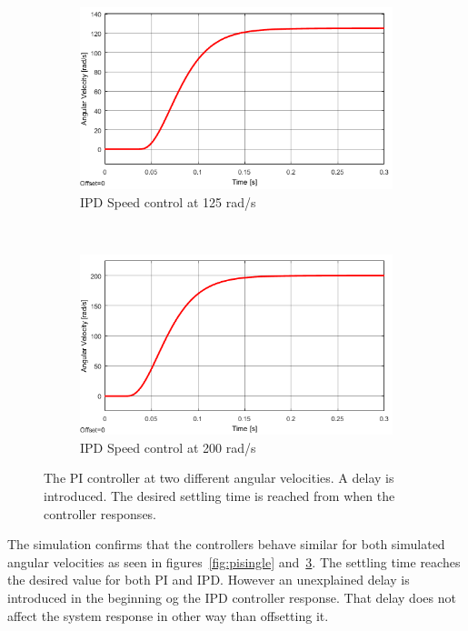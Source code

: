 \begin{figure}[h!]
	\centering
	\begin{subfigure}[b]{0.45\textwidth}
		\includegraphics[width=\textwidth]{graphics/IPD_single125}
		\caption{IPD Speed control at 125 rad/s}
		\label{fig:ipdsingle125}
	\end{subfigure}
	~ %
	\begin{subfigure}[b]{0.45\textwidth}
		\includegraphics[width=\textwidth]{graphics/IPD_single200}
		\caption{IPD Speed control at 200 rad/s}
		\label{fig:ipdsingle200}
	\end{subfigure}
	\caption{The PI controller at two different angular velocities. A delay is introduced. The desired settling time is reached from when the controller responses.}\label{fig:ipdsingle}
\end{figure}



The simulation confirms that the controllers behave similar for both simulated angular velocities as seen in figures~\ref{fig:pisingle} and~\ref{fig:ipdsingle}. The settling time reaches the desired value for both PI and IPD. However an unexplained delay is introduced in the beginning og the IPD controller response. That delay does not affect the system response in other way than offsetting it.

